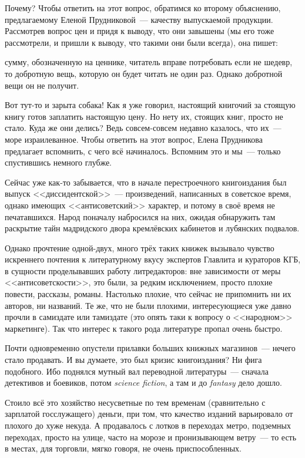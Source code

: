Почему? Чтобы ответить на этот вопрос, обратимся ко второму объяснению, предлагаемому Еленой Прудниковой~--- качеству выпускаемой продукции. Рассмотрев вопрос цен и придя к выводу, что они завышены (мы его тоже рассмотрели, и пришли к выводу, что такими они были всегда), она пишет:

\begin{shadequote}{}
 сумму, обозначенную на ценнике, читатель вправе потребовать если не шедевр, то добротную вещь, которую он будет читать не один раз. Однако добротной вещи он не получит.
\end{shadequote}

Вот тут-то и зарыта собака! Как я уже говорил, настоящий книгочий за стоящую книгу готов заплатить настоящую цену. Но нету их, стоящих книг, просто не стало. Куда же они делись? Ведь совсем-совсем недавно казалось, что их~--- море израилеванное. Чтобы ответить на этот вопрос, Елена Прудникова предлагает вспомнить, с чего всё начиналось. Вспомним это и мы~--- только спустившись немного глубже.

Сейчас уже как-то забывается, что в начале перестроечного книгоиздания был выпуск <<диссидентской>>~--- произведений, написанных в советское время, однако имеющих <<антисоветский>> характер, и потому в своё время не печатавшихся. Народ поначалу набросился на них, ожидая обнаружить там раскрытие тайн мадридского двора кремлёвских кабинетов и лубянских подвалов.

Однако прочтение одной-двух, много трёх таких книжек вызывало чувство искреннего почтения к литературному вкусу экспертов Главлита и кураторов КГБ, в сущности проделывавших работу литредакторов: вне зависимости от меры <<антисоветскости>>, это были, за редким исключением, просто плохие повести, рассказы, романы. Настолько плохие, что сейчас не припомнить ни их авторов, ни названий. Те же, что не были плохими, интересующиеся уже давно прочли в самиздате или тамиздате (это опять таки к вопросу о <<народном>> маркетинге). Так что интерес к такого рода литературе пропал очень быстро.

Почти одновременно опустели прилавки больших книжных магазинов~--- нечего стало продавать. И вы думаете, это был кризис книгоиздания? Ни фига подобного. Ибо поднялся мутный вал переводной литературы~--- сначала детективов и боевиков, потом \textit{science fiction}, а там и до \textit{fantasy} дело дошло.

Стоило всё это хозяйство несусветные по тем временам (сравнительно с зарплатой госслужащего) деньги, при том, что качество изданий варьировало от плохого до хуже некуда.  А продавалось с лотков в переходах метро, подземных переходах, просто на улице, часто на морозе и пронизывающем ветру~--- то есть в местах, для торговли, мягко говоря, не очень приспособленных.

